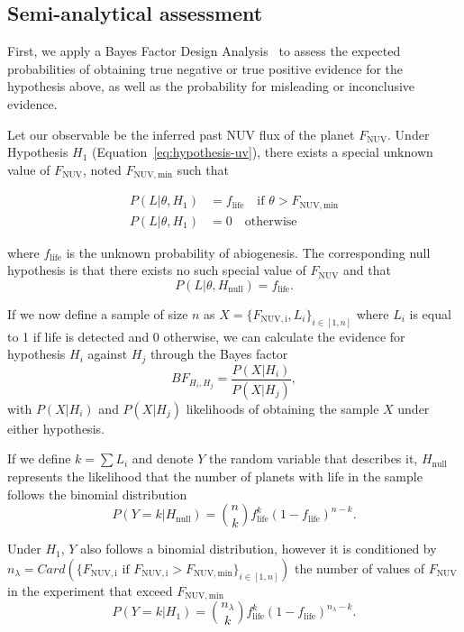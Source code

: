 \documentclass[modern,linenumbers]{aastex631}
\begin{document}
\subsection{Semi-analytical assessment}\label{sec:met-semianalytical}
First, we apply a Bayes Factor Design Analysis~\citep{Schoenbrodt2018} to assess the expected probabilities of obtaining true negative or true positive evidence for the hypothesis above, as well as the probability for misleading or inconclusive evidence.

Let our observable be the inferred past \gls{NUV} flux of the planet $F_\mathrm{NUV}$.
Under Hypothesis $H_1$ (Equation~\ref{eq:hypothesis-uv}), there exists a special unknown value of $F_\mathrm{NUV}$, noted $F_\mathrm{NUV, min}$ such that

\begin{align}
    P(L|\theta,H_1) &=  f_\mathrm{life} \quad \text{if } \theta>F_\mathrm{NUV, min}\\
    P(L|\theta,H_1) &=  0               \quad  \text{otherwise}
\end{align}

where $f_\mathrm{life}$ is the unknown probability of abiogenesis.
The corresponding null hypothesis is that there exists no such special value of $F_\mathrm{NUV}$ and that
\begin{equation}
P(L|\theta,H_\mathrm{null}) = f_\mathrm{life}.
\end{equation}

If we now define a sample of size $n$ as $X=\{F_\mathrm{NUV, i},L_i\}_{i \in [1,n]}$ where $L_i$ is equal to 1 if life is detected and 0 otherwise, we can calculate the evidence for hypothesis $H_i$ against $H_j$ through the Bayes factor
\begin{equation}
BF_{H_i,H_j} = \frac{P(X|H_i)}{P(X|H_j)},
\end{equation}
with $P(X|H_i)$ and $P(X|H_j)$ likelihoods of obtaining the sample $X$ under either hypothesis.

If we define $k=\sum L_i$ and denote $Y$ the random variable that describes it, $H_\mathrm{null}$ represents the likelihood that the number of planets with life in the sample follows the binomial distribution
\begin{equation}
P(Y=k|H_\mathrm{null}) = \binom{n}{k}f_\mathrm{life}^k(1-f_\mathrm{life})^{n-k}.
\end{equation}

Under $H_1$, $Y$ also follows a binomial distribution, however it is conditioned by $n_{\lambda}=Card(\{F_\mathrm{NUV, i} \text{ if } F_\mathrm{NUV, i}>F_\mathrm{NUV, min}\}_{i \in [1,n]})$ the number of values of $F_\mathrm{NUV}$ in the experiment that exceed $F_\mathrm{NUV, min}$
\begin{equation}
P(Y=k|H_1) = \binom{n_{\lambda}}{k}f_\mathrm{life}^k(1-f_\mathrm{life})^{n_{\lambda}-k}.
\end{equation}
\end{document}
